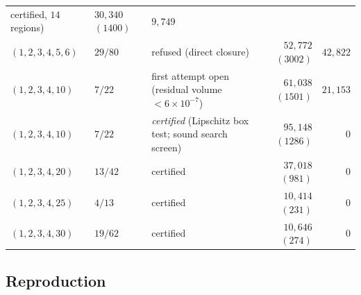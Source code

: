 \begin{table}[htbp]
\begin{tabularx}{\textwidth}{@{} l l >{\raggedright\arraybackslash}X r r @{}}
certified, $14$ regions) & $30{,}340$ $(1400)$ & $9{,}749$ \\
$(1,2,3,4,5,6)$ & $29/80$ & refused (direct closure) & $52{,}772$
$(3002)$ & $42{,}822$ \\
$(1,2,3,4,10)$ & $7/22$ & first attempt open (residual volume
$<6\times10^{-7}$) & $61{,}038$ $(1501)$ & $21{,}153$ \\
$(1,2,3,4,10)$ & $7/22$ & \emph{certified} (Lipschitz box test; sound
search screen) & $95{,}148$ $(1286)$ & $0$ \\
$(1,2,3,4,20)$ & $13/42$ & certified & $37{,}018$ $(981)$ & $0$ \\
$(1,2,3,4,25)$ & $4/13$ & certified & $10{,}414$ $(231)$ & $0$ \\
$(1,2,3,4,30)$ & $19/62$ & certified & $10{,}646$ $(274)$ & $0$ \\
\bottomrule
\end{tabularx}
\end{table}

\subsection{Reproduction}


